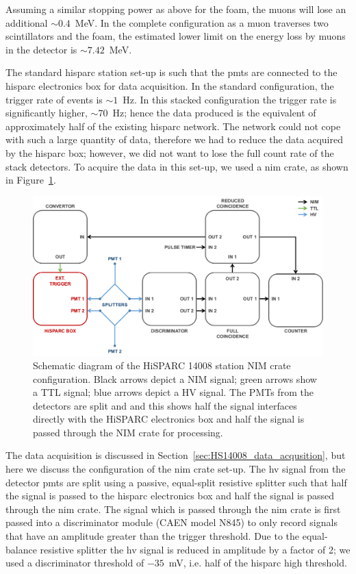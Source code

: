  Assuming a similar stopping power as above for the foam, the muons will lose an additional $\sim 0.4$~MeV. In the complete configuration as a muon traverses two scintillators and the foam, the estimated lower limit on the energy loss by muons in the detector is $\sim 7.42$~MeV.


The standard \gls{hisparc} station set-up is such that the \glspl{pmt} are connected to the \gls{hisparc} electronics box for data acquisition. In the standard configuration, the trigger rate of events is $\sim 1$~Hz. In this stacked configuration the trigger rate is significantly higher, $\sim 70$~Hz; hence the data produced is the equivalent of approximately half of the existing \gls{hisparc} network. The network could not cope with such a large quantity of data, therefore we had to reduce the data acquired by the \gls{hisparc} box; however, we did not want to lose the full count rate of the stack detectors. To acquire the data in this set-up, we used a \gls{nim} crate, as shown in Figure~\ref{fig:14008_NIM}.

\begin{figure}[ht!]
	\centering
	\includegraphics[width=\columnwidth]{14008_nim_config.png}
	\caption{Schematic diagram of the HiSPARC 14008 station NIM crate configuration. Black arrows depict a NIM signal; green arrows show a TTL signal; blue arrows depict a HV signal. The PMTs from the detectors are split and and this shows half the signal interfaces directly with the HiSPARC electronics box and half the signal is passed through the NIM crate for processing.}
	\label{fig:14008_NIM}
\end{figure}

The data acquisition is discussed in Section~\ref{sec:HS14008_data_acqusition}, but here we discuss the configuration of the \gls{nim} crate set-up. The \gls{hv} signal from the detector \glspl{pmt} are split using a passive, equal-split resistive splitter such that half the signal is passed to the \gls{hisparc} electronics box and half the signal is passed through the \gls{nim} crate. The signal which is passed through the \gls{nim} crate is first passed into a discriminator module (CAEN model N845) to only record signals that have an amplitude greater than the trigger threshold. Due to the equal-balance resistive splitter the \gls{hv} signal is reduced in amplitude by a factor of 2; we used a discriminator threshold of $-35$~mV, i.e. half of the \gls{hisparc} high threshold.

